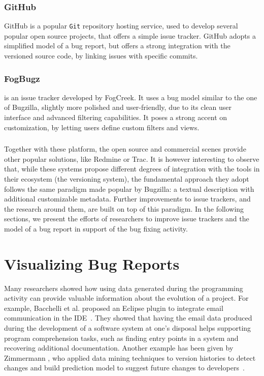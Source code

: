 \subsubsection{GitHub}
GitHub is a popular \texttt{Git} repository hosting service, used to develop several popular open source projects, that offers a simple issue tracker. GitHub adopts a simplified model of a bug report, but offers a strong integration with the versioned source code, by linking issues with specific commits.

\subsubsection{FogBugz}
\fbz{} is an issue tracker developed by FogCreek. It uses a bug model similar to the one of Bugzilla, slightly more polished and user-friendly, due to its clean user interface and advanced filtering capabilities. It poses a strong accent on customization, by letting users define custom filters and views.

\subsubsection{} %
Together with these platform, the open source and commercial scenes provide other popular solutions, like Redmine or Trac.
It is however interesting to observe that, while these systems propose different degrees of integration with the tools in their ecosystem (\eg the versioning system), the fundamental approach they adopt follows the same paradigm made popular by Bugzilla: a textual description with additional customizable metadata.
Further improvements to issue trackers, and the research around them, are built on top of this paradigm.
In the following sections, we present the efforts of researchers to improve issue trackers and the model of a bug report in support of the bug fixing activity.



\section{Visualizing Bug Reports}\label{sec:related-visualize} %

Many researchers showed how using data generated during the programming activity can provide valuable information about the evolution of a project.
For example, Bacchelli et al. proposed an Eclipse plugin to integrate email communication in the IDE~\cite{Bacc2011a}.
They showed that having the email data produced during the development of a software system at one's disposal helps supporting program comprehension tasks, such as finding entry points in a system and recovering additional documentation.
Another example has been given by Zimmermann \etal, who applied data mining techniques to version histories to detect changes and build prediction model to suggest future changes to developers~\cite{Zimm2004a}.


